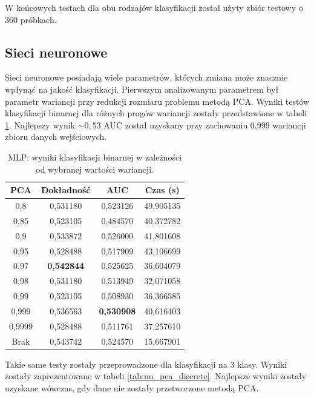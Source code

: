\documentclass[a4paper, twoside, 11pt, openright]{article}
\begin{document}
W końcowych testach dla obu rodzajów klasyfikacji został użyty zbiór testowy o 360 próbkach.

\subsection{Sieci neuronowe}

Sieci neuronowe posiadają wiele parametrów, których zmiana może znacznie wpłynąć na jakość klasyfikacji. Pierwszym analizowanym parametrem był parametr wariancji przy redukcji rozmiaru problemu metodą PCA. Wyniki testów klasyfikacji binarnej dla różnych progów wariancji zostały przedstawione w tabeli \ref{tab:nn_pca_binary}. Najlepszy wynik $\sim 0,53$ AUC został uzyskany przy zachowaniu 0,999 wariancji zbioru danych wejściowych.

\begin{table}[H]
    \centering
    \begin{tabular}{|c|c|c|c|}
    \hline
        \textbf{PCA} & \textbf{Dokładność} &  \textbf{AUC} &  \textbf{Czas (s)} \\ \hline
0,8                &  0,531180 &  0,523126 &   49,905135 \\ \hline
0,85               &  0,523105 &  0,484570 &   40,372782 \\ \hline
0,9                &  0,533872 &  0,526000 &   41,801608 \\ \hline
0,95               &  0,528488 &  0,517909 &   43,106699 \\ \hline
0,97               &  \textbf{0,542844} &  0,525625 &   36,604079 \\ \hline
0,98               &  0,531180 &  0,513949 &   32,071058 \\ \hline
0,99               &  0,523105 &  0,508930 &   36,366585 \\ \hline
0,999              &  0,536563 &  \textbf{0,530908} &   40,616403 \\ \hline
0,9999             &  0,528488 &  0,511761 &   37,257610 \\ \hline
Brak               &  0,543742 &  0,524570 &   15,667901 \\ \hline

    \end{tabular}
    \caption{MLP: wyniki klasyfikacji binarnej w zależności od wybranej wartości wariancji.}
    \label{tab:nn_pca_binary}
\end{table}

Takie same testy zostały przeprowadzone dla klasyfikacji na 3 klasy. Wyniki zostały zaprezentowane w tabeli \ref{tab:nn_pca_discrete}. Najlepsze wyniki zostały uzyskane wówczas, gdy dane nie zostały przetworzone metodą PCA.
\end{document}
